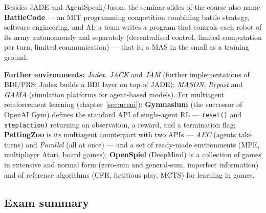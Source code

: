 \documentclass[11pt,a4paper]{article}
\theoremstyle{definition}
\begin{document}
Besides JADE and AgentSpeak/Jason, the seminar slides of the course also name
\textbf{BattleCode} --- an MIT programming competition combining battle strategy, software
engineering, and AI: a team writes a program that controls each robot of its army
autonomously and separately (decentralised control, limited computation per turn, limited
communication) --- that is, a MAS in the small as a training ground.

\textbf{Further environments:} \emph{Jadex}, \emph{JACK} and \emph{JAM} (further implementations
of BDI/PRS; Jadex builds a BDI layer on top of JADE); \emph{MASON}, \emph{Repast} and
\emph{GAMA} (simulation platforms for agent-based models). For multiagent reinforcement
learning (chapter~\ref{sec:uceni}): \textbf{Gymnasium} (the successor of OpenAI Gym) defines
the standard API of single-agent RL --- \texttt{reset()} and \texttt{step(action)} returning
an observation, a reward, and a termination flag; \textbf{PettingZoo} is its multiagent
counterpart with two APIs --- \emph{AEC} (agents take turns) and \emph{Parallel} (all at
once) --- and a set of ready-made environments (MPE, multiplayer Atari, board games);
\textbf{OpenSpiel} (DeepMind) is a collection of games in extensive and normal form (zero-sum
and general-sum, imperfect information) and of reference algorithms (CFR, fictitious play,
MCTS) for learning in games.

\subsection{Exam summary}
\end{document}
